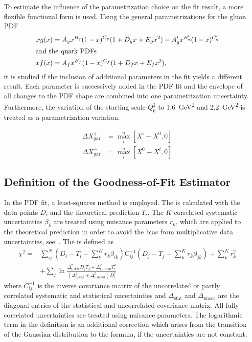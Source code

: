 To estimate the influence of the parametrization choice on the fit result, a
more flexible functional form is used. Using the general
parametrizations for the gluon PDF
%
\begin{align*}
   xg(x) &= A_g x^{B_g} (1-x)^{C_g} (1  + D_g x + E_g x^2) - A'_g x^{B'_g} (1-x)^{C'_g}\\
\intertext{and the quark PDFs}
   xf(x) &= A_{f}  x^{B_{f}} (1-x)^{C_{f}} (1 + D_{f}x + E_{f}x^2),
\end{align*}
%
it is studied if the inclusion of additional parameters in the fit yields
a different result. Each parameter is successively added in the PDF fit and the
envelope of all changes to the PDF shape are combined into one parametrization
uncertainty. Furthermore, the variation of the starting scale $Q_0^2$ to
\SI{1.6}{\GeV\squared} and \SI{2.2}{\GeV\squared} is treated as a
parametrization variation.

\begin{align*}
  \Delta X^+_{\mathrm{par}} &= \max_{i}^{n} \left[ X^i - X^0, 0 \right]\\
  \Delta X^-_{\mathrm{par}} &= \max_{i}^{n} \left[ X^0 - X^i, 0 \right]
\end{align*}


\subsection{Definition of the Goodness-of-Fit Estimator}
\label{sec:chi2_definition}

In the PDF fit, a least-squares method is employed. The \chisq is
calculated with the data points $D_i$ and the theoretical prediction $T_i$. The
$K$ correlated systematic uncertainties $\beta_{k}$ are treated using nuisance parameters
$r_k$, which are applied to the theoretical prediction in order to avoid the bias from
multiplicative data uncertainties, see~\cite{Lyons:1989gh}. The \chisq is
defined as
%
\begin{align*}
  \chi^2 = &\sum_{ij}^N \left(D_i - T_i - \sum_k^K r_k \beta_{ik}\right) \mathrm{C}_{ij}^{-1}
  \left(D_j - T_j - \sum_k^K r_k \beta_{jk} \right) + \sum_k^K r_k^2\\
  &+ \sum_j \ln \frac{\Delta_{i,\mathrm{stat}}^2 D_j T_j + \Delta_{i,\mathrm{uncor}}^2 T_i^2}{\left( \Delta_{i,\mathrm{stat}}^2 + \Delta_{i,\mathrm{uncor}}^2 \right) D_i^2}
  \label{chi2_nuisance}
\end{align*}
%
where $C_{ij}^{-1}$ is the inverse covariance matrix of the uncorrelated or
partly correlated systematic and statistical uncertainties and $\Delta_\mathrm{stat}$ and
$\Delta_\mathrm{uncor}$ are the diagonal entries of the statistical and
uncorrelated covariance matrix. All fully correlated uncertainties are treated using
nuisance parameters. The logarithmic term in the \chisq definition is an additional
correction which arises from the transition of the Gaussian distribution to the
\chisq formula, if the uncertainties are not constant.

